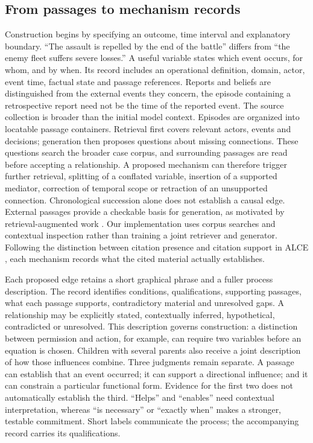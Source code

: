 \documentclass{svproc}
\begin{document}
\subsection{From passages to mechanism records}
Construction begins by specifying an outcome, time interval and explanatory boundary. ``The assault is repelled by the end of the battle'' differs from ``the enemy fleet suffers severe losses.'' A useful variable states which event occurs, for whom, and by when. Its record includes an operational definition, domain, actor, event time, factual state and passage references. Reports and beliefs are distinguished from the external events they concern, the episode containing a retrospective report need not be the time of the reported event.
The source collection is broader than the initial model context. Episodes are organized into locatable passage containers. Retrieval first covers relevant actors, events and decisions; generation then proposes questions about missing connections. These questions search the broader case corpus, and surrounding passages are read before accepting a relationship. A proposed mechanism can therefore trigger further retrieval, splitting of a conflated variable, insertion of a supported mediator, correction of temporal scope or retraction of an unsupported connection. Chronological succession alone does not establish a causal edge.
External passages provide a checkable basis for generation, as motivated by retrieval-augmented work \cite{lewis2020}. Our implementation uses corpus searches and contextual inspection rather than training a joint retriever and generator. Following the distinction between citation presence and citation support in ALCE \cite{gao_citations2023}, each mechanism records what the cited material actually establishes.

Each proposed edge retains a short graphical phrase and a fuller process description. The record identifies conditions, qualifications, supporting passages, what each passage supports, contradictory material and unresolved gaps. A relationship may be explicitly stated, contextually inferred, hypothetical, contradicted or unresolved. This description governs construction: a distinction between permission and action, for example, can require two variables before an equation is chosen. Children with several parents also receive a joint description of how those influences combine.
Three judgments remain separate. A passage can establish that an event occurred; it can support a directional influence; and it can constrain a particular functional form. Evidence for the first two does not automatically establish the third. ``Helps'' and ``enables'' need contextual interpretation, whereas ``is necessary'' or ``exactly when'' makes a stronger, testable commitment. Short labels communicate the process; the accompanying record carries its qualifications.
\end{document}
